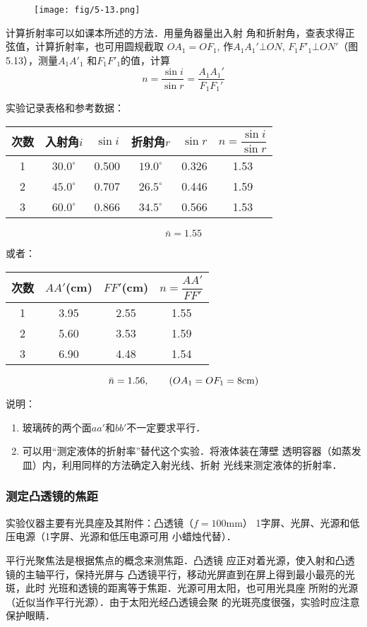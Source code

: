 \begin{figure}[htp]
    \centering
    \texttt{[image: fig/5-13.png]}
    \caption{}
\end{figure}

计算折射率可以如课本所述的方法．用量角器量出入射
角和折射角，查表求得正弦值，计算折射率，也可用圆规截取
$OA_1=OF_1$, 作$A_1A_1'\bot ON$, $F_1F'_1\bot ON'$（图5.13），测量$A_1A'_1$
和$F_1F'_1$的值，计算 
$$n=\frac{\sin i}{\sin r}=\frac{A_1A_1'}{F_1F_1'}$$

实验记录表格和参考数据：
\begin{center}
\begin{tabular}{c|ccccc}
\hline
次数&入射角$i$&$\sin i$&折射角$r$ &$\sin r$&$n=\dfrac{\sin i}{\sin r}$\\
\hline
1&$30.0^{\circ}$&0.500&$19.0^{\circ}$&0.326&1.53\\
2&$45.0^{\circ}$&0.707&$26.5^{\circ}$&0.446&1.59\\
3&$60.0^{\circ}$&0.866&$34.5^{\circ}$&0.566&1.53\\
\hline
\end{tabular}
\[\bar n=1.55\]
\end{center}
或者：
\begin{center}
\begin{tabular}{c|ccc}
\hline
次数&$AA'$(cm)&$FF'$(cm)&$n=\dfrac{AA'}{FF'}$\\
\hline
1&3.95&2.55&1.55\\
2&5.60&3.53&1.59\\
3&6.90&4.48&1.54\\
\hline
\end{tabular}
\[\bar n=1.56,\qquad (OA_1=OF_1=8{\rm cm})\]
\end{center}

说明：
\begin{enumerate}
\item 玻璃砖的两个面$aa'$和$bb'$不一定要求平行．
\item  可以用“测定液体的折射率”替代这个实验．将液体装在薄壁
透明容器（如蒸发皿）内，利用同样的方法确定入射光线、折射
光线来测定液体的折射率．
\end{enumerate}

\subsubsection{测定凸透镜的焦距}
实验仪器主要有光具座及其附件：凸透镜（$f=100$mm）
1字屏、光屏、光源和低压电源（1字屏、光源和低压电源可用
小蜡烛代替）．

平行光聚焦法是根据焦点的概念来测焦距．凸透镜
应正对着光源，使入射和凸透镜的主轴平行，保持光屏与
凸透镜平行，移动光屏直到在屏上得到最小最亮的光斑，此时
光班和透镜的距离等于焦距．光源可用太阳，也可用光具座
所附的光源（近似当作平行光源）．由于太阳光经凸透镜会聚
的光斑亮度很强，实验时应注意保护眼睛．

